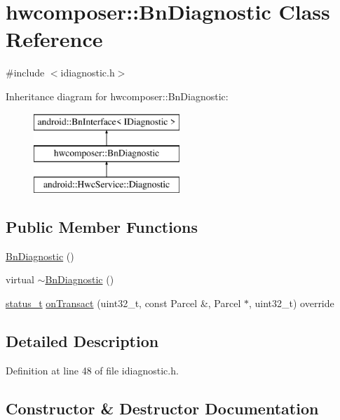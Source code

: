 \hypertarget{classhwcomposer_1_1BnDiagnostic}{}\section{hwcomposer\+:\+:Bn\+Diagnostic Class Reference}
\label{classhwcomposer_1_1BnDiagnostic}


{\ttfamily \#include $<$idiagnostic.\+h$>$}

Inheritance diagram for hwcomposer\+:\+:Bn\+Diagnostic\+:\begin{figure}[H]
\begin{center}
\leavevmode
\includegraphics[height=3.000000cm]{classhwcomposer_1_1BnDiagnostic}
\end{center}
\end{figure}
\subsection*{Public Member Functions}
\begin{DoxyCompactItemize}
\item 
\mbox{\hyperlink{classhwcomposer_1_1BnDiagnostic_a0dae02c0aa18aa54bb5aefb2ef9b4cd5}{Bn\+Diagnostic}} ()
\item 
virtual \mbox{\hyperlink{classhwcomposer_1_1BnDiagnostic_acb90849642dd99099514c8d4ec1ee55b}{$\sim$\+Bn\+Diagnostic}} ()
\item 
\mbox{\hyperlink{hwcserviceapi_8h_a3806fb2027d9a316d8ca8d9b8b8eb96f}{status\+\_\+t}} \mbox{\hyperlink{classhwcomposer_1_1BnDiagnostic_a3b524b73de19be10529cefa88ecd59ff}{on\+Transact}} (uint32\+\_\+t, const Parcel \&, Parcel $\ast$, uint32\+\_\+t) override
\end{DoxyCompactItemize}


\subsection{Detailed Description}


Definition at line 48 of file idiagnostic.\+h.



\subsection{Constructor \& Destructor Documentation}
\mbox{\label{classhwcomposer_1_1BnDiagnostic_a0dae02c0aa18aa54bb5aefb2ef9b4cd5}} 
